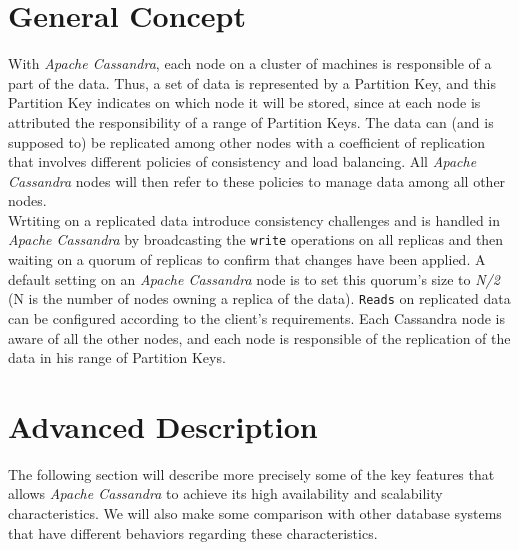 \documentclass[a4paper]{report}
\newcommand{\ca}{\emph{Apache Cassandra\xspace}}
\begin{document}
\section{General Concept}
With \ca{}, each node on a cluster of machines is responsible of a part of the data. Thus, a set of data is represented by a Partition Key, and this Partition Key indicates on which node it will be stored, since at each node is attributed the responsibility of a range of Partition Keys. The data can (and is supposed to) be replicated among other nodes with a coefficient of replication that involves different policies of consistency and load balancing. All \ca{} nodes will then refer to these policies to manage data among all other nodes.\\
Wrtiting on a replicated data introduce consistency challenges and is handled in \ca{} by broadcasting the \verb;write; operations on all replicas and then waiting on a quorum of replicas to confirm that changes have been applied. A default setting on an \ca{} node is to set this quorum's size to \emph{N/2} (N is the number of nodes owning a replica of the data). \verb;Reads; on replicated data can be configured according to the client's requirements. Each Cassandra node is aware of all the other nodes, and each node is responsible of the replication of the data in his range of Partition Keys.

\section{Advanced Description}
The following section will describe more precisely some of the key features that allows \ca{} to achieve its high availability and scalability characteristics. We will also make some comparison with other database systems that have different behaviors regarding these characteristics.
\end{document}
